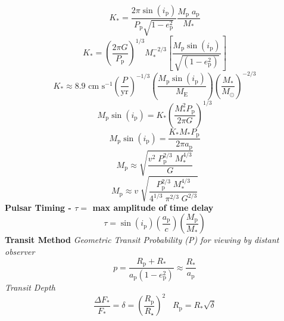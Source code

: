 \documentclass{spy}
\begin{document}
\begin{equation}
K_\mathrm{*} = \frac {2 \pi \sin(i_\mathrm{p})} {P_\mathrm{p} \sqrt {1-e_\mathrm{p}^2}} \frac {M_\mathrm{p} \; a_\mathrm{p}} {M_\mathrm{*}}
\end{equation}
\begin{equation}
K_\mathrm{*} = \left(\frac {2 \pi G}{P_\mathrm{p}}\right)^{1/3} M_\mathrm{*}^{-2/3} \left[ \frac {M_\mathrm{p} \sin(i_\mathrm{p})}{\sqrt{\left(1-e_\mathrm{p}^2\right)}} \right]
\end{equation}
\begin{equation}
K_\mathrm{*} \approx 8.9 \text{ cm s}^{-1} \left( \frac{P}{\mathrm{yr}} \right)^{-1/3} \left( \frac{M_\mathrm{p} \sin(i_\mathrm{p})}{M_\mathrm{E} } \right) \left( \frac{M_\mathrm{*}}{M_\mathrm{\odot}} \right)^{-2/3}
\end{equation}
\begin{equation}
M_\mathrm{p} \sin(i_\mathrm{p}) = K_\mathrm{*} \left( \frac {M_\mathrm{*}^2 P_\mathrm{p}} {2 \pi G} \right) ^{1/3}
\end{equation}
\begin{equation}
M_\mathrm{p} \sin(i_\mathrm{p}) = \frac {K_\mathrm{*} M_\mathrm{*} P_\mathrm{p}} {2 \pi a_\mathrm{p}}
\end{equation}
\begin{equation}
M_\mathrm{p} \approx \sqrt{\frac{v^2 \; P^{2/3}_\mathrm{p} \; M^{4/3}_\mathrm{*}}{G}}
\end{equation}
\begin{equation}
M_\mathrm{p} \approx v \; \sqrt{\frac{P^{2/3}_\mathrm{p} \; M^{4/3}_\mathrm{*}}{4^{1/3} \; \pi^{2/3} \; G^{2/3}}}
\end{equation}
\textbf {Pulsar Timing - \(\tau = \) max amplitude of time delay}
\begin{equation}
\tau =  \sin(i_\mathrm{p}) \left( \frac {a_\mathrm{p}} {c} \right) \left( \frac {M_\mathrm{p}} {M_\mathrm{*}} \right)
\end{equation}
\textbf {Transit Method}
\textit{Geometric Transit Probability (P) for viewing by distant observer}
\begin{equation}
p = \frac{R_\mathrm{p} + R_\mathrm{*}}{a_\mathrm{p}(1 - e^2_\mathrm{p})} \approx \frac{R_\mathrm{*}}{a_\mathrm{p}}
\end{equation}
\textit{Transit Depth}
\begin{equation}
\frac{\Delta F_\mathrm{*}}{F_\mathrm{*}} = \delta =  \left( \frac {R_\mathrm{p}} {R_\star} \right)^2 \; \; \; R_\mathrm{p} = R_\mathrm{*} \sqrt{\delta}
\end{equation}
\end{document}
